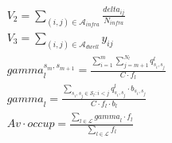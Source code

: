 \begin{align}
  & V_{2} = \underset{\left(i , j\right) \in \mathbf{\mathcal{A}}_{infra}}{\sum} \frac{\mathit{delta}_{i j}}{N_{infra}} \tag{eq\_0038} \\
  & V_{3} = \underset{\left(i , j\right) \in \mathbf{\mathcal{A}}_{dwell}}{\sum} y_{i j} \tag{eq\_0039} \\
  & \mathit{gamma}_{l}^{s_{m} , s_{m + 1}} = \frac{\sum_{i = 1}^{m} \sum_{j = m + 1}^{N_{l}} q_{s_{i} , s_{j}}^{l}}{C \cdot f_{l}} \tag{eq\_0040} \\
  & \mathit{gamma}_{l} = \frac{\sum_{s_{i} , s_{j} \in \mathbf{\mathcal{S}}_{l} : i < j} q_{s_{i} , s_{j}}^{l} \cdot b_{s_{i} , s_{j}}}{C \cdot f_{l} \cdot b_{l}} \tag{eq\_0041} \\
  & \mathit{Av} \cdot \mathit{occup} = \frac{\sum_{l \in \mathbf{\mathcal{L}}} \mathit{gamma}_{l} \cdot f_{l}}{\sum_{l \in \mathbf{\mathcal{L}}} f_{l}} \tag{eq\_0042} \\
\end{align}
